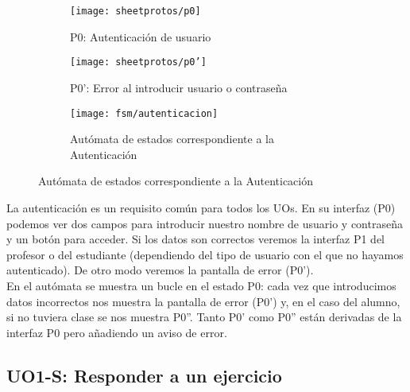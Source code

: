 \begin{figure}[H]
\begin{subfigure}[b]{0.5\textwidth}
	\centering
	\texttt{[image: sheetprotos/p0]}
	\caption{P0: Autenticación de usuario}
	\label{fig:req-autenticacion:p0}
\end{subfigure}
%
\begin{subfigure}[b]{0.5\textwidth}
	\centering
	\texttt{[image: sheetprotos/p0']}
	\caption{P0': Error al introducir usuario o contraseña}
	\label{fig:req-autenticacion:p0'}
\end{subfigure}
%
\begin{subfigure}[b]{0.9\textwidth}
	\centering
	\texttt{[image: fsm/autenticacion]}
	\caption{Autómata de estados correspondiente a la Autenticación}
	\label{fig:fsm-autenticacion}
\end{subfigure}

\label{fig:autenticacion}
\end{figure}

La autenticación es un requisito común para todos los UOs. En su interfaz (P0) podemos ver dos campos para introducir nuestro nombre de usuario y contraseña y un botón para acceder. Si los datos son correctos veremos la interfaz P1 del profesor o del estudiante (dependiendo del tipo de usuario con el que no hayamos autenticado). De otro modo veremos la pantalla de error (P0').\\

En el autómata se muestra un bucle en el estado P0: cada vez que introducimos datos incorrectos nos muestra la pantalla de error (P0') y, en el caso del alumno, si no tuviera clase se nos muestra P0''. Tanto P0' como P0'' están derivadas de la interfaz P0 pero añadiendo un aviso de error.\\

\subsection{UO1-S: Responder a un ejercicio}
\label{analisis-de-requisitos:funcionales:uo1s}


